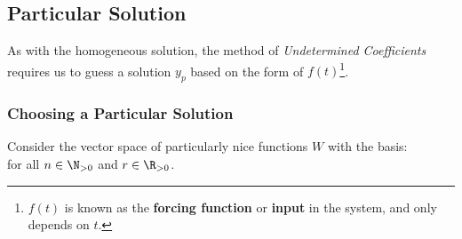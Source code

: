 \documentclass{article}
\begin{document}
\subsection{Particular Solution}
As with the homogeneous solution, the method of \emph{Undetermined Coefficients}
requires us to guess a solution \(y_p\) based on the form of \(f\left( t \right)\)\footnote{\(f\left( t \right)\) is known as the
    \textbf{forcing function} or \textbf{input} in the system, and only depends on \(t\).}.
\subsubsection{Choosing a Particular Solution}
Consider the vector space of particularly nice functions \(W\) with the basis:
\begin{equation*}
\end{equation*}
for all \(n \in \N_{>0}\) and \(r \in \R_{>0}\).
\end{document}
